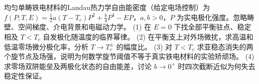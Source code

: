 均匀单畴铁电材料的Landau热力学自由能密度（给定电场控制）为
\(f(P;T,E)=\frac12 a(T-T_c)P^2+\frac b4P^4-EP\)，\(a,b>0\)，\(P\) 为实电极化强度。忽略畴壁、空间梯度、介电背景和电磁动力学。
(1) 在 \(E=0\) 下找全部平衡驻点、稳定相及 \(T<T_c\) 自发极化随温度的临界幂律。
(2) 在平衡支上对外场微扰，求高温和低温零场微分极化率，分析 \(T\to T_c^\pm\) 的幅度比。
(3) 对 \(T<T_c\) 求亚稳态消失的两个旋节点及场强，说明为何数学旋节阈值不等于真实铁电材料的实验矫顽场。
(4) 求零场双阱能垒及两极化状态的自由能差，讨论 \(b\to0^+\) 时四次截断近似为何失去稳定性保证。

